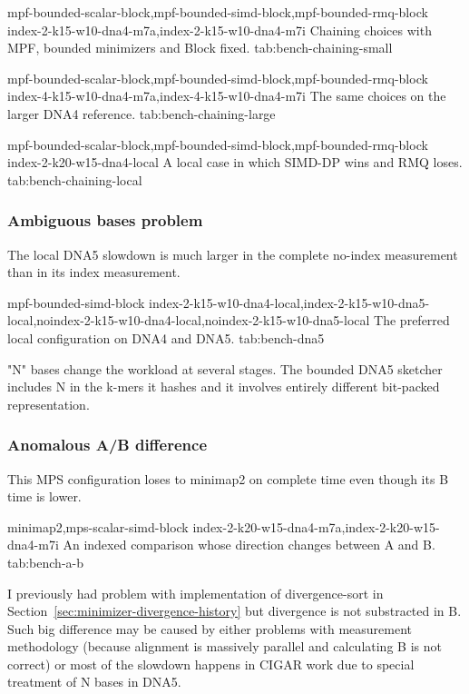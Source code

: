   {mpf-bounded-scalar-block,mpf-bounded-simd-block,mpf-bounded-rmq-block}
  {index-2-k15-w10-dna4-m7a,index-2-k15-w10-dna4-m7i}
  {Chaining choices with MPF, bounded minimizers and Block fixed.}
  {tab:bench-chaining-small}

  {mpf-bounded-scalar-block,mpf-bounded-simd-block,mpf-bounded-rmq-block}
  {index-4-k15-w10-dna4-m7a,index-4-k15-w10-dna4-m7i}
  {The same choices on the larger DNA4 reference.}
  {tab:bench-chaining-large}

  {mpf-bounded-scalar-block,mpf-bounded-simd-block,mpf-bounded-rmq-block}
  {index-2-k20-w15-dna4-local}
  {A local case in which SIMD-DP wins and RMQ loses.}
  {tab:bench-chaining-local}


\subsubsection{Ambiguous bases problem}
\label{sec:bench-dna5}

The local DNA5 slowdown is much larger in the complete no-index measurement
than in its index measurement.

  {mpf-bounded-simd-block}
  {index-2-k15-w10-dna4-local,index-2-k15-w10-dna5-local,noindex-2-k15-w10-dna4-local,noindex-2-k15-w10-dna5-local}
  {The preferred local configuration on DNA4 and DNA5.}
  {tab:bench-dna5}

"N" bases change the workload at several stages. The bounded DNA5
sketcher includes N in the k-mers it hashes and it involves entirely different bit-packed representation.

\subsubsection{Anomalous A/B difference}
\label{sec:bench-a-b}

This MPS configuration loses to minimap2 on complete time even though its
B time is lower.

  {minimap2,mps-scalar-simd-block}
  {index-2-k20-w15-dna4-m7a,index-2-k20-w15-dna4-m7i}
  {An indexed comparison whose direction changes between A and B.}
  {tab:bench-a-b}

I previously had problem with implementation of divergence-sort in
Section~\ref{sec:minimizer-divergence-history} but divergence is not substracted in B.
Such big difference may be caused by either problems with measurement methodology (because alignment is massively parallel and calculating B is not correct) or most of the slowdown happens in CIGAR work
due to special treatment of N bases in DNA5.

